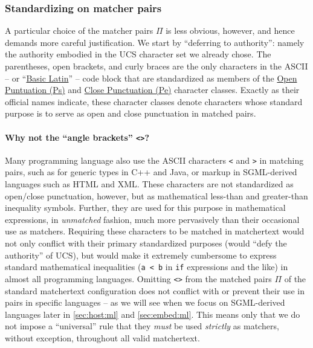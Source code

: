 \subsubsection{Standardizing on matcher pairs}
\label{sec:design:concrete:standard}

A particular choice of the matcher pairs $\Pi$ is less obvious, however,
and hence demands more careful justification.
We start by ``deferring to authority'':
namely the authority embodied in
the UCS character set we already chose.
The parentheses, open brackets, and curly braces
are the only characters in the ASCII --
or ``\href{https://www.compart.com/en/unicode/block/U+0000}{Basic Latin}'' -- 
code block that are standardized as members of the
\href{https://www.compart.com/en/unicode/category/Ps}{Open Puntuation (Ps)}
and 
\href{https://www.compart.com/en/unicode/category/Pe}{Close Punctuation (Pe)}
character classes.
Exactly as their official names indicate,
these character classes denote characters whose standard purpose
is to serve as open and close punctuation in matched pairs.

\paragraph{Why not the ``angle brackets'' \texttt{<>}?}
Many programming language also use the ASCII characters \verb|<| and \verb|>|
in matching pairs,
such as for generic types in C++ and Java,
or markup in SGML-derived languages such as HTML and XML.
These characters are not standardized as open/close punctuation, however,
but as mathematical less-than and greater-than inequality symbols.
Further, they are used for this purpose in mathematical expressions,
in \emph{unmatched} fashion,
much more pervasively than their occasional use as matchers.
Requiring these characters to be matched in matchertext
would not only conflict with their primary standardized purposes
(\ie would ``defy the authority'' of UCS),
but would make it extremely cumbersome to express
standard mathematical inequalities
(\eg \verb|a < b| in \verb|if| expressions and the like)
in almost all programming languages.
Omitting \verb|<>| from the matched pairs $\Pi$
of the standard matchertext configuration does not
conflict with or prevent their use in pairs in specific languages --
as we will see when we focus on SGML-derived languages later
in \cref{sec:host:ml} and \cref{sec:embed:ml}.
This means only that we do not impose a ``universal'' rule
that they \emph{must} be used \emph{strictly} as matchers,
without exception, throughout all valid matchertext.

